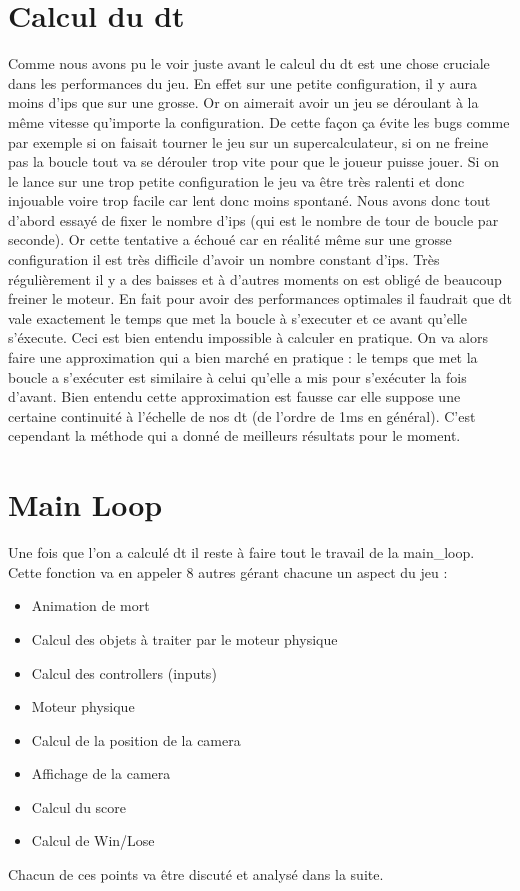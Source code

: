 \documentclass[11pt]{article}
\begin{document}
\section{Calcul du dt}
Comme nous avons pu le voir juste avant le calcul du dt est une chose cruciale dans les performances du jeu. En effet sur une petite configuration, il y aura moins d'ips que sur une grosse. Or on aimerait avoir un jeu se déroulant à la même vitesse qu'importe la configuration. De cette façon ça évite les bugs comme par exemple si on faisait tourner le jeu sur un supercalculateur, si on ne freine pas la boucle tout va se dérouler trop vite pour que le joueur puisse jouer. Si on le lance sur une trop petite configuration le jeu va être très ralenti et donc injouable voire trop facile car lent donc moins spontané. Nous avons donc tout d'abord essayé de fixer le nombre d'ips (qui est le nombre de tour de boucle par seconde). Or cette tentative a échoué car en réalité même sur une grosse configuration il est très difficile d'avoir un nombre constant d'ips. Très régulièrement il y a des baisses et à d'autres moments on est obligé de beaucoup freiner le moteur. En fait pour avoir des performances optimales il faudrait que dt vale exactement le temps que met la boucle à s'executer et ce avant qu'elle s'éxecute. Ceci est bien entendu impossible à calculer en pratique. On va alors faire une approximation qui a bien marché en pratique : le temps que met la boucle a s'exécuter est similaire à celui qu'elle a mis pour s'exécuter la fois d'avant. Bien entendu cette approximation est fausse car elle suppose une certaine continuité à l'échelle de nos dt (de l'ordre de 1ms en général). C'est cependant la méthode qui a donné de meilleurs résultats pour le moment.
\section{Main Loop}
Une fois que l'on a calculé dt il reste à faire tout le travail de la main\_loop. Cette fonction va en appeler 8 autres gérant chacune un aspect du jeu : 
\begin{itemize}
\item Animation de mort
\item Calcul des objets à traiter par le moteur physique
\item Calcul des controllers (inputs)
\item Moteur physique
\item Calcul de la position de la camera
\item Affichage de la camera
\item Calcul du score
\item Calcul de Win/Lose
\end{itemize}
Chacun de ces points va être discuté et analysé dans la suite.
\end{document}
